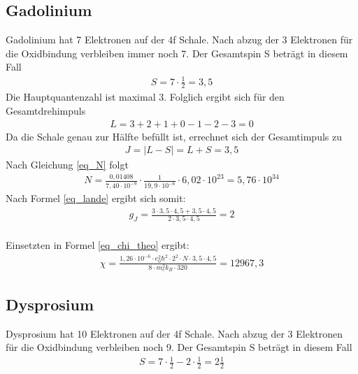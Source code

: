 \subsection{Gadolinium }
Gadolinium hat 7 Elektronen auf der 4f Schale. Nach abzug der 3 Elektronen für die Oxidbindung verbleiben immer noch 7. Der Gesamtspin S beträgt in diesem Fall \begin{align*}
S=7\cdot\frac{1}{2} = 3,5
\end{align*}
Die Hauptquantenzahl ist maximal 3. Folglich ergibt sich für den Gesamtdrehimpuls
\begin{align*}
L=3+2+1+0-1-2-3=0
\end{align*}
Da die Schale genau zur Hälfte befüllt ist, errechnet sich der Gesamtimpuls zu 
\begin{align*}
J=|L-S|=L+S=3,5
\end{align*}
Nach Gleichung \eqref{eq_N} folgt
\begin{align}
	N=\frac{0,01408}{7,40\cdot10^{-9}}\cdot\frac{1}	{19,9\cdot10^{-6}}\cdot6,02\cdot10^{23}=5,76\cdot10^{34}
\end{align}
Nach Formel \eqref{eq_lande} ergibt sich somit:
\begin{align}
g_J=\frac{3\cdot3,5\cdot4,5+3,5\cdot4,5}{2\cdot 3,5\cdot4,5}=2
\end{align}\\
Einsetzten in Formel \eqref{eq_chi_theo} ergibt:
\begin{align}
\chi= \frac{1,26\cdot 10^{-6}\cdot e_0^2\hbar^2\cdot 2^2 \cdot N\cdot 3,5\cdot 4,5}{8\cdot m_e^2 k_B \cdot320}=12967,3
\end{align}

\subsection{Dysprosium }
Dysprosium hat 10 Elektronen auf der 4f Schale. Nach abzug der 3 Elektronen für die Oxidbindung verbleiben noch 9. Der Gesamtspin S beträgt in diesem Fall 
\begin{align*}
S= 7\cdot \frac{1}{2}-2\cdot\frac{1}{2}= 2 \frac{1}{2}
\end{align*}

